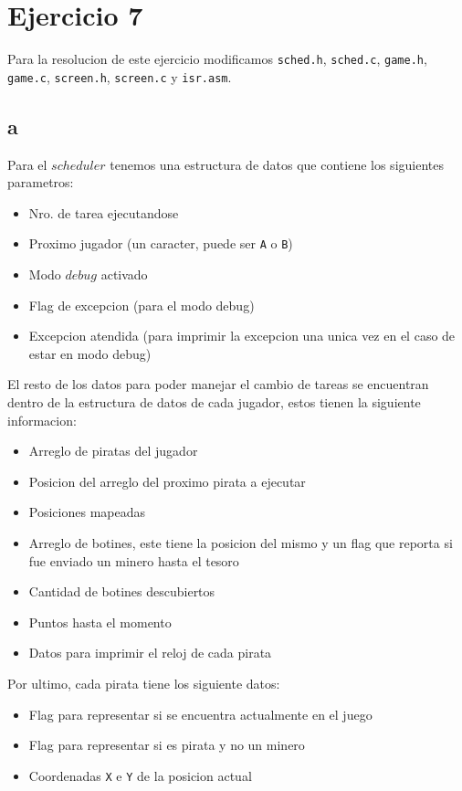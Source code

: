 \section{Ejercicio 7}

Para la resolucion de este ejercicio modificamos \texttt{sched.h}, \texttt{sched.c}, \texttt{game.h}, \texttt{game.c}, \texttt{screen.h}, \texttt{screen.c} y \texttt{isr.asm}.

\subsection{a}

Para el $scheduler$ tenemos una estructura de datos que contiene los siguientes parametros:

\begin{itemize}
	\item Nro. de tarea ejecutandose
	\item Proximo jugador (un caracter, puede ser \texttt{A} o \texttt{B})
	\item Modo $debug$ activado
	\item Flag de excepcion (para el modo debug)
	\item Excepcion atendida (para imprimir la excepcion una unica vez en el caso de estar en modo debug)
\end{itemize}

El resto de los datos para poder manejar el cambio de tareas se encuentran dentro de la estructura de datos de cada jugador, estos tienen la siguiente informacion:

\begin{itemize}
	\item Arreglo de piratas del jugador
	\item Posicion del arreglo del proximo pirata a ejecutar
	\item Posiciones mapeadas
	\item Arreglo de botines, este tiene la posicion del mismo y un flag que reporta si fue enviado un minero hasta el tesoro
	\item Cantidad de botines descubiertos
	\item Puntos hasta el momento
	\item Datos para imprimir el reloj de cada pirata
\end{itemize}

Por ultimo, cada pirata tiene los siguiente datos:

\begin{itemize}
	\item Flag para representar si se encuentra actualmente en el juego
	\item Flag para representar si es pirata y no un minero
	\item Coordenadas \texttt{X} e \texttt{Y} de la posicion actual
\end{itemize}

